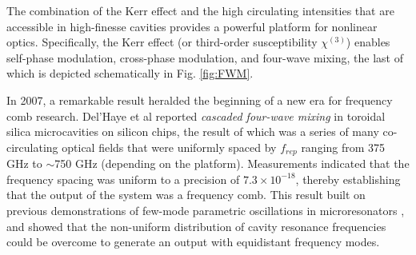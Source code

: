 The combination of the Kerr effect and the high circulating intensities that are accessible in high-finesse cavities provides a powerful platform for nonlinear optics. Specifically, the Kerr effect (or third-order susceptibility $\chi^{(3)}$) enables self-phase modulation, cross-phase modulation, and four-wave mixing, the last of which is depicted schematically in Fig. \ref{fig:FWM}. 

In 2007, a remarkable result heralded the beginning of a new era for frequency comb research. Del'Haye et al reported \textit{cascaded four-wave mixing} in toroidal silica microcavities on silicon chips, the result of which was a series of many co-circulating optical fields that were uniformly spaced by $f_{rep}$ ranging from 375 GHz to $\sim$750 GHz (depending on the platform)\cite{DelHaye2007}. Measurements indicated that the frequency spacing was uniform to a precision of $7.3 \times 10^{-18}$, thereby establishing that the output of the system was a frequency comb. This result built on previous demonstrations of few-mode parametric oscillations in microresonators \cite{Kippenberg2004, Savchenkov2004,Agha2007}, and showed that the non-uniform distribution of cavity resonance frequencies could be overcome to generate an output with equidistant frequency modes. 





%
%
%
%
%
%
%
%
%
%
% 
